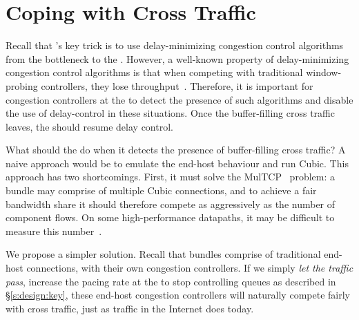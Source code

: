 \section{Coping with Cross Traffic}\label{s:queue-ctl}

Recall that \name's key trick is to use delay-minimizing congestion control algorithms from the bottleneck to the \inbox.
However, a well-known property of delay-minimizing congestion control algorithms is that when competing with traditional window-probing  controllers, they lose throughput~\cite{copa}.
Therefore, it is important for congestion controllers at the \inbox to detect the presence of such algorithms and disable the use of delay-control in these situations.
Once the buffer-filling cross traffic leaves, the \inbox should resume delay control.

What should the \inbox do when it detects the presence of buffer-filling cross traffic?
A naive approach would be to emulate the end-host behaviour and run Cubic. This approach has two shortcomings.
First, it must solve the MulTCP~\cite{multcp} problem: a bundle may comprise of multiple Cubic connections, and to achieve a fair bandwidth share it should therefore compete as aggressively as the number of component flows. 
On some high-performance datapaths, it may be difficult to measure this number~\cite{heavy-hitters}. 

We propose a simpler solution.
Recall that bundles comprise of traditional end-host connections, with their own congestion controllers. 
If we simply \emph{let the traffic pass}, \ie increase the pacing rate at the \inbox to stop controlling queues as described in \S\ref{s:design:key}, these end-host congestion controllers will naturally compete fairly with cross traffic, just as traffic in the Internet does today. 


